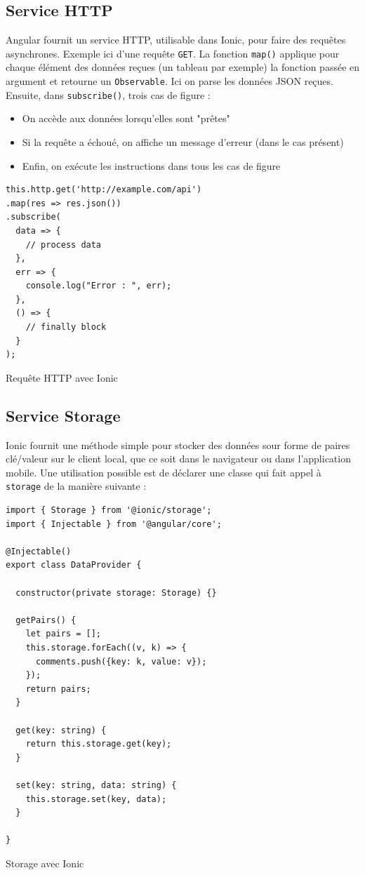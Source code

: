 \documentclass[a4paper, 12pt]{article}
\newenvironment{code}{\captionsetup{type=listing}}{}
\begin{document}
\subsection{Service HTTP}
Angular fournit un service HTTP, utilisable dans Ionic, pour faire des requêtes asynchrones. Exemple ici d'une 
requête \texttt{GET}. La fonction \texttt{map()} applique pour chaque élément des données 
reçues (un tableau par exemple) la fonction passée en argument et retourne un \texttt{Observable}. 
Ici on parse les données JSON reçues. Ensuite, dans \texttt{subscribe()}, trois cas de figure :
\begin{itemize}
    \item On accède aux données lorsqu'elles sont "prêtes"
    \item Si la requête a échoué, on affiche un message d'erreur (dans le cas présent)
    \item Enfin, on exécute les instructions dans tous les cas de figure
\end{itemize}
\begin{code}
    \begin{verbatim}
this.http.get('http://example.com/api')
.map(res => res.json())
.subscribe(
  data => {
    // process data
  },
  err => {
    console.log("Error : ", err);
  },
  () => {
    // finally block
  }
);
    \end{verbatim}
    \caption{Requête HTTP avec Ionic}
\end{code}

\subsection{Service Storage}
Ionic fournit une méthode simple pour stocker des données sour forme de paires clé/valeur sur le client local, 
que ce soit dans le navigateur ou dans l'application mobile. Une utilisation possible est de déclarer une classe 
qui fait appel à \texttt{storage} de la manière suivante \cite{ref70} :
\begin{code}
    \begin{verbatim}
import { Storage } from '@ionic/storage';
import { Injectable } from '@angular/core';

@Injectable()
export class DataProvider {

  constructor(private storage: Storage) {}

  getPairs() {
    let pairs = [];
    this.storage.forEach((v, k) => {
      comments.push({key: k, value: v});
    });
    return pairs;
  }

  get(key: string) {
    return this.storage.get(key);
  }
 
  set(key: string, data: string) {
    this.storage.set(key, data);
  }

}
    \end{verbatim}
    \caption{Storage avec Ionic}
\end{code}
\end{document}
